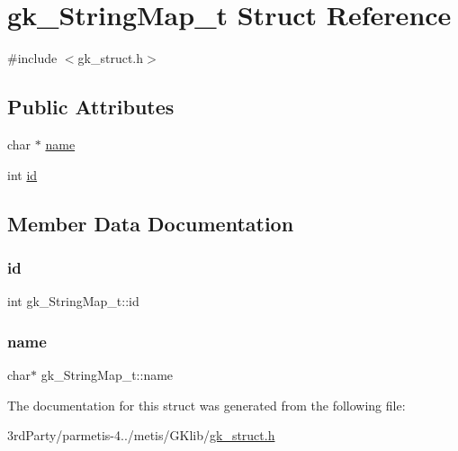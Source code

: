 \hypertarget{structgk___string_map__t}{}\section{gk\+\_\+\+String\+Map\+\_\+t Struct Reference}
\label{structgk___string_map__t}


{\ttfamily \#include $<$gk\+\_\+struct.\+h$>$}

\subsection*{Public Attributes}
\begin{DoxyCompactItemize}
\item 
char $\ast$ \hyperlink{structgk___string_map__t_a22d4edf70d41af7c5ed2db52ee09eb99}{name}
\item 
int \hyperlink{structgk___string_map__t_a167db63a424bbf4d1709685edd191c3a}{id}
\end{DoxyCompactItemize}


\subsection{Member Data Documentation}
\mbox{\label{structgk___string_map__t_a167db63a424bbf4d1709685edd191c3a}} 
\subsubsection{\texorpdfstring{id}{id}}
{\footnotesize\ttfamily int gk\+\_\+\+String\+Map\+\_\+t\+::id}

\mbox{\label{structgk___string_map__t_a22d4edf70d41af7c5ed2db52ee09eb99}} 
\subsubsection{\texorpdfstring{name}{name}}
{\footnotesize\ttfamily char$\ast$ gk\+\_\+\+String\+Map\+\_\+t\+::name}



The documentation for this struct was generated from the following file\+:\begin{DoxyCompactItemize}
\item 
3rd\+Party/parmetis-\/4../metis/\+G\+Klib/\hyperlink{gk__struct_8h}{gk\+\_\+struct.\+h}\end{DoxyCompactItemize}
